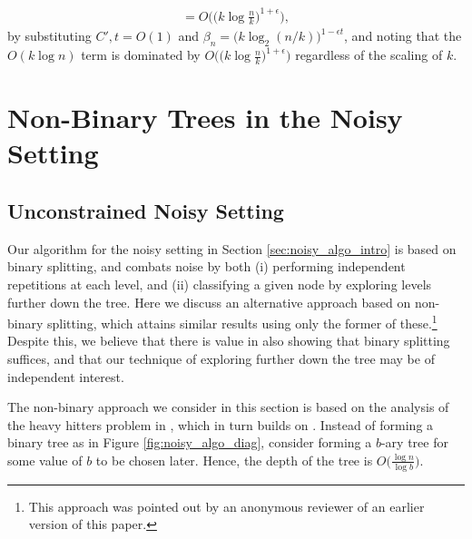 \begin{itemize}
\begin{align}
        =O\bigg(\Big(k\log\frac{n}{k}\Big)^{1+\epsilon}\bigg), \label{eq:final_decoding_time}
    \end{align}
    by substituting $C',t=O(1)$ and $\beta_n=\big(k\log_2(n/k)\big)^{1-\epsilon t}$, and noting that the $O(k \log n)$ term is dominated by $O\big(\big(k\log\frac{n}{k}\big)^{1+\epsilon}\big)$ regardless of the scaling of $k$.
\end{itemize}

\section{Non-Binary Trees in the Noisy Setting} \label{sec:non_binary}

\subsection{Unconstrained Noisy Setting}

Our algorithm for the noisy setting in Section \ref{sec:noisy_algo_intro} is based on binary splitting, and combats noise by both (i) performing independent repetitions at each level, and (ii) classifying a given node by exploring levels further down the tree.  Here we discuss an alternative approach based on non-binary splitting, which attains similar results using only the former of these.\footnote{This approach was pointed out by an anonymous reviewer of an earlier version of this paper.}  Despite this, we believe that there is value in also showing that binary splitting suffices, and that our technique of exploring further down the tree may be of independent interest.

The non-binary approach we consider in this section is based on the analysis of the heavy hitters problem in \cite[Sec.~B.2]{Lar19}, which in turn builds on \cite{Cor08}.  Instead of forming a binary tree as in Figure \ref{fig:noisy_algo_diag}, consider forming a $b$-ary tree for some value of $b$ to be chosen later.  Hence, the depth of the tree is $O\big( \frac{\log n}{\log b} \big)$.  

